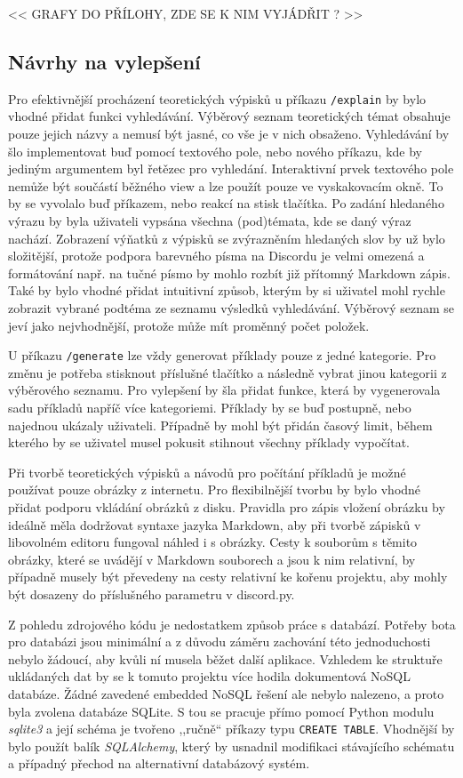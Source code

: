 \documentclass[FM]{tulthesis}
\begin{document}
	<< GRAFY DO PŘÍLOHY, ZDE SE K NIM VYJÁDŘIT ? >>
	
	\subsection{Návrhy na vylepšení}
	
	Pro efektivnější procházení teoretických výpisků u příkazu \verb|/explain| by bylo vhodné přidat funkci vyhledávání. Výběrový seznam teoretických témat obsahuje pouze jejich názvy a nemusí být jasné, co vše je v nich obsaženo. Vyhledávání by šlo implementovat buď pomocí textového pole, nebo nového příkazu, kde by jediným argumentem byl řetězec pro vyhledání. Interaktivní prvek textového pole nemůže být součástí běžného view a lze použít pouze ve vyskakovacím okně. To by se vyvolalo buď příkazem, nebo reakcí na stisk tlačítka. Po zadání hledaného výrazu by byla uživateli vypsána všechna (pod)témata, kde se daný výraz nachází. Zobrazení výňatků z výpisků se zvýrazněním hledaných slov by už bylo složitější, protože podpora barevného písma na Discordu je velmi omezená a formátování např. na tučné písmo by mohlo rozbít již přítomný Markdown zápis. Také by bylo vhodné přidat intuitivní způsob, kterým by si uživatel mohl rychle zobrazit vybrané podtéma ze seznamu výsledků vyhledávání. Výběrový seznam se jeví jako nejvhodnější, protože může mít proměnný počet položek.
	
	U příkazu \verb|/generate| lze vždy generovat příklady pouze z jedné kategorie. Pro změnu je potřeba stisknout příslušné tlačítko a následně vybrat jinou kategorii z výběrového seznamu. Pro vylepšení by šla přidat funkce, která by vygenerovala sadu příkladů napříč více kategoriemi. Příklady by se buď postupně, nebo najednou ukázaly uživateli. Případně by mohl být přidán časový limit, během kterého by se uživatel musel pokusit stihnout všechny příklady vypočítat.
	
	Při tvorbě teoretických výpisků a návodů pro počítání příkladů je možné \mbox{používat} pouze obrázky z internetu. Pro flexibilnější tvorbu by bylo vhodné přidat podporu vkládání obrázků z disku. Pravidla pro zápis vložení obrázku by ideálně měla dodržovat syntaxe jazyka Markdown, aby při tvorbě zápisků v libovolném editoru fungoval náhled i s obrázky. Cesty k souborům s těmito obrázky, které se uvádějí v Markdown souborech a jsou k nim relativní, by případně musely být převedeny na cesty relativní ke kořenu projektu, aby mohly být dosazeny do příslušného parametru v discord.py.
	
	Z pohledu zdrojového kódu je nedostatkem způsob práce s databází. Potřeby bota pro databázi jsou minimální a z důvodu záměru zachování této jednoduchosti nebylo žádoucí, aby kvůli ní musela běžet další aplikace. Vzhledem ke struktuře ukládaných dat by se k tomuto projektu více hodila dokumentová NoSQL databáze. Žádné zavedené embedded NoSQL řešení ale nebylo nalezeno, a proto byla zvolena databáze SQLite. S tou se pracuje přímo pomocí Python modulu \textit{sqlite3} a její schéma je tvořeno ,,ručně`` příkazy typu \verb|CREATE TABLE|. Vhodnější by bylo použít balík \textit{SQLAlchemy}, který by usnadnil modifikaci stávajícího schématu a případný přechod na alternativní databázový systém.
	
\end{document}
